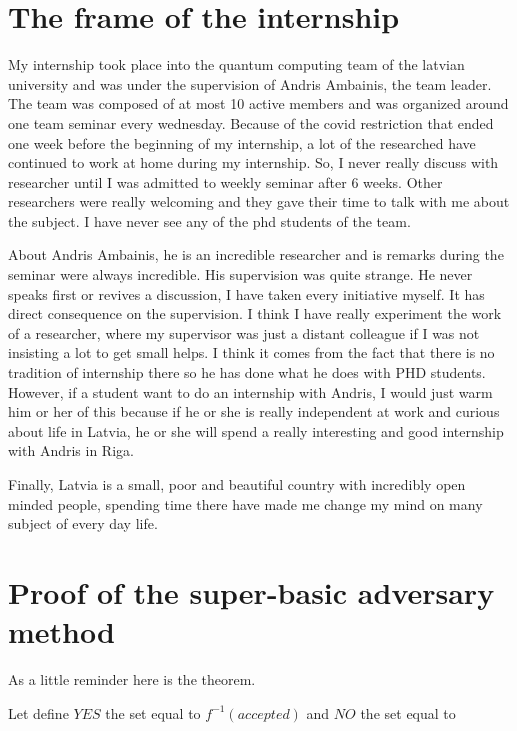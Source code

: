 \begin{appendix}

    \section*{The frame of the internship}

    My internship took place into the quantum computing team of the latvian
    university and was under the supervision of Andris Ambainis, the team leader.
    The team was composed of at most 10 active members and was organized around
    one team seminar every wednesday. Because of the covid restriction that ended
    one week before the beginning of my internship, a lot of the researched have
    continued to work at home during my internship. So, I never really discuss
    with researcher until I was admitted to weekly seminar after 6 weeks. Other
    researchers were really welcoming and they gave their time to talk with me
    about the subject. I have never see any of the phd students of the team.

    About Andris Ambainis, he is an incredible researcher and is remarks during
    the seminar were always incredible. His supervision was quite strange. He
    never speaks first or revives a discussion, I have taken every initiative myself.
    It has direct consequence on the supervision. I think I have really
    experiment the work of a researcher, where my supervisor was just a distant
    colleague if I was not insisting a lot to get small helps. I think it comes from
    the fact that there is no tradition of internship there so he has done what
    he does with PHD students. However, if a student want to do an internship
    with Andris, I would just warm him or her of this because if he or she
    is really independent at work and curious about life in Latvia, he or she
    will spend a really interesting and good internship with Andris in Riga.

    Finally, Latvia is a small, poor and beautiful country with incredibly open minded
    people, spending time there have made me change my mind on many subject of
    every day life.

    \section{Proof of the super-basic adversary method}\label{proof:advmethod}
    As a little reminder here is the theorem.
    \begin{theorem}
        Let define $YES$ the set equal to $f^{-1}(accepted)$ and $NO$ the set
        equal to


\end{theorem}
\end{appendix}
